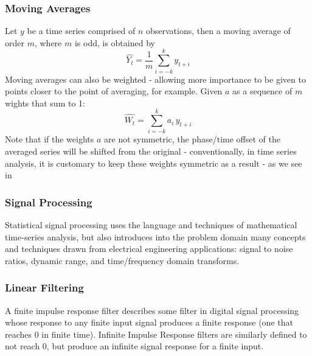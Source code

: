 \documentclass[9pt,conference]{IEEEtran}
\begin{document}
\subsubsection{Moving Averages}
 Let $y$ be a time series comprised of $n$ observations, then a moving average of order $m$, where $m$ is odd, is obtained by
        \begin{equation}
            \hat{Y_t} = \frac{1}{m}\sum_{i = -k}^{k}y_{t+i}
        \end{equation}
        Moving averages can also be weighted - allowing more importance to be given to points closer to the point of averaging, for example. Given $a$ as a sequence of $m$ wights that sum to 1:
        \begin{equation}
            \hat{W_t} = \sum_{i = -k}^{k}a_i\,y_{t+i}
        \end{equation}
        Note that if the weights $a$ are not symmetric, the phase/time offset of the averaged series will be shifted from the original - conventionally, in time series analysis, it is customary to keep these weights symmetric as a result - as we see in \cite{brockwell2002introduction}



\subsubsection{Signal Processing}
Statistical signal processing uses the language and techniques of mathematical time-series analysis, but also introduces into the problem domain many concepts and techniques drawn from electrical engineering applications: signal to noise ratios, dynamic range, and time/frequency domain transforms.

\subsubsection{Linear Filtering}
A finite impulse response filter describes some filter in digital signal processing whose response to any finite input signal produces a finite response (one that reaches 0 in finite time). Infinite Impulse Response filters are similarly defined to not reach 0, but produce an infinite signal response for a finite input. 
\end{document}
